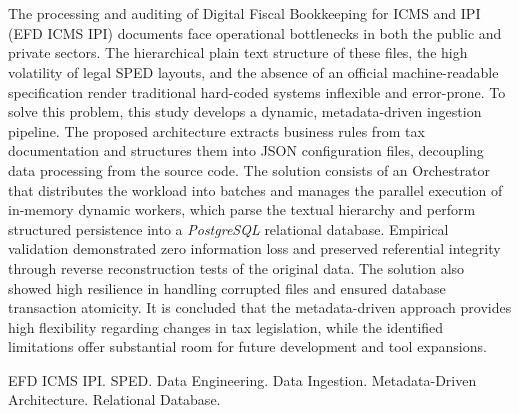 \section*{}
\noindent The processing and auditing of Digital Fiscal Bookkeeping for ICMS
and IPI (EFD ICMS IPI) documents face operational bottlenecks in both the
public and private sectors. The hierarchical plain text structure of these
files, the high volatility of legal SPED layouts, and the absence of an
official machine-readable specification render traditional hard-coded
systems inflexible and error-prone. To solve this problem, this study
develops a dynamic, metadata-driven ingestion pipeline. The proposed
architecture extracts business rules from tax documentation and structures
them into JSON configuration files, decoupling data processing from the source
code. The solution consists of an Orchestrator that distributes the workload
into batches and manages the parallel execution of in-memory dynamic workers,
which parse the textual hierarchy and perform structured persistence into a
\textit{PostgreSQL} relational database. Empirical validation demonstrated
zero information loss and preserved referential integrity through reverse
reconstruction tests of the original data. The solution also showed high
resilience in handling corrupted files and ensured database transaction
atomicity. It is concluded that the metadata-driven approach provides high
flexibility regarding changes in tax legislation, while the identified
limitations offer substantial room for future development and tool expansions.

\vspace{\baselineskip}

 EFD ICMS IPI.
SPED. Data Engineering.
Data Ingestion.
Metadata-Driven Architecture.
Relational Database.